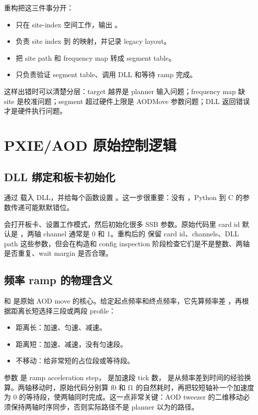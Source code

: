 \documentclass[11pt,oneside,openany]{book}
\begin{document}
重构把这三件事分开：
\begin{itemize}
  \item {} 只在 site-index 空间工作，输出 。
  \item {} 负责 site index 到  的映射，并记录 legacy layout。
  \item {} 把 site path 和 frequency map 转成  segment table。
  \item {} 只负责验证 segment table、调用 DLL 和等待 ramp 完成。
\end{itemize}
这样出错时可以清楚分层：target 越界是 planner 输入问题；frequency map 缺 site 是校准问题；segment 超过硬件上限是 AODMove 参数问题；DLL 返回错误才是硬件执行问题。

\chapter{PXIE/AOD 原始控制逻辑}
\section{DLL 绑定和板卡初始化}
 通过  载入 DLL，并给每个函数设置 。这一步很重要：没有 ，Python 到 C 的参数传递可能默默错位。

 会打开板卡、设置工作模式，然后初始化很多 SSB 参数。原始代码里 card id 默认是 ，两轴 channel 通常是 0 和 1。重构后的  保留 card id、channels、DLL path 这些参数，但会在构造和 config inspection 阶段检查它们是不是整数、两轴是否重复、wait margin 是否合理。

\section{频率 ramp 的物理含义}
 和  是原始 AOD move 的核心。给定起点频率和终点频率，它先算频率差 ，再根据距离长短选择三段或两段 profile：
\begin{itemize}
  \item 距离长：加速、匀速、减速。
  \item 距离短：加速、减速，没有匀速段。
  \item 不移动：给非常短的占位段或等待段。
\end{itemize}
参数  是 ramp acceleration step， 是加速段 tick 数， 是从频率差到时间的经验换算。两轴移动时，原始代码分别算 f0 和 f1 的自然耗时，再把较短轴补一个加速度为 0 的等待段，使两轴同时完成。这一点非常关键：AOD tweezer 的二维移动必须保持两轴时序同步，否则实际路径不是 planner 以为的路径。
\end{document}
